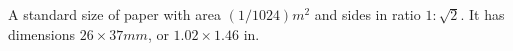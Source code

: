 A standard size of paper with area $(1/1024)m^{2}$  and sides in ratio
$ 1 : \sqrt{2}$. It has dimensions $ 26 \times 37mm$, or $1.02 \times 1.46$ in.